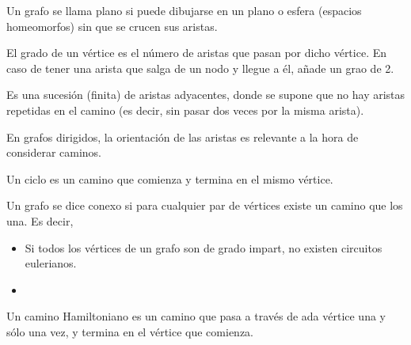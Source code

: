 \begin{definicion}
    Un grafo se llama plano si puede dibujarse en un plano o esfera (espacios homeomorfos) sin que se crucen sus aristas.
\end{definicion}

\begin{defincion}
    El grado de un vértice es el número de aristas que pasan por dicho vértice.
    En caso de tener una arista que salga de un nodo y llegue a él, añade un grao de 2.
\end{defincion}

\begin{definicion}[Camino]
    Es una sucesión (finita) de aristas adyacentes, donde se supone que no hay aristas repetidas en el camino (es decir, sin pasar dos veces por la misma arista).
\end{definicion}
En grafos dirigidos, la orientación de las aristas es relevante a la hora de considerar caminos.

\begin{definicion}[Ciclo]
   Un ciclo es un camino que comienza y termina en el mismo vértice. 
\end{definicion}

\begin{definicion}
    Un grafo se dice conexo si para cualquier par de vértices existe un camino que los una. Es decir, 
\end{definicion}

\begin{teo}
    \begin{itemize}
        \item Si todos los vértices de un grafo son de grado impart, no existen circuitos eulerianos.
        \item 
    \end{itemize}
    
\end{teo}

\begin{definicion}
    Un camino Hamiltoniano es un camino que pasa a través de ada vértice una y sólo una vez, y termina en el vértice que comienza.
\end{definicion}

